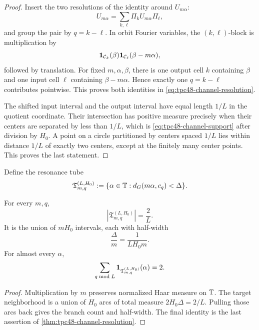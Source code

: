 \begin{proof}
Insert the two resolutions of the identity around \(U_{m\alpha}\):
\[
 U_{m\alpha}=\sum_{k,\ell}\Pi_kU_{m\alpha}\Pi_\ell,
\]
and group the pair by \(q=k-\ell\).  In orbit Fourier variables, the
\((k,\ell)\)-block is multiplication by
\begin{equation}
 \mathbf 1_{\mathcal C_k}(\beta)
 \mathbf 1_{\mathcal C_\ell}(\beta-m\alpha),
 \label{eq:tpc48-tile-multiplier}
\end{equation}
followed by translation.  For fixed \(m,\alpha,\beta\), there is one
output cell \(k\) containing \(\beta\) and one input cell \(\ell\)
containing \(\beta-m\alpha\).  Hence exactly one \(q=k-\ell\)
contributes pointwise.  This proves both identities in
\eqref{eq:tpc48-channel-resolution}.

The shifted input interval and the output interval have equal length
\(1/L\) in the quotient coordinate.  Their intersection has positive
measure precisely when their centers are separated by less than
\(1/L\), which is \eqref{eq:tpc48-channel-support} after division by
\(H_0\).  A point on a circle partitioned by centers spaced \(1/L\)
lies within distance \(1/L\) of exactly two centers, except at the
finitely many center points.  This proves the last statement.
\end{proof}

Define the resonance tube
\begin{equation}
 \mathfrak T_{m,q}^{(L,H_0)}
 :=\{\alpha\in\mathbb T:d_G(m\alpha,c_q)<\Delta\}.
 \label{eq:tpc48-resonance-tube}
\end{equation}

\begin{corollary}
\label{cor:tpc48-tube-geometry}
For every \(m,q\),
\begin{equation}
 |\mathfrak T_{m,q}^{(L,H_0)}|=\frac2L.
 \label{eq:tpc48-tube-measure}
\end{equation}
It is the union of \(mH_0\) intervals, each with half-width
\begin{equation}
 \frac{\Delta}{m}=\frac1{LH_0m}.
 \label{eq:tpc48-tube-halfwidth}
\end{equation}
For almost every \(\alpha\),
\begin{equation}
 \sum_{q\bmod L}\mathbf 1_{\mathfrak T_{m,q}^{(L,H_0)}}(\alpha)=2.
 \label{eq:tpc48-two-active-tubes}
\end{equation}
\end{corollary}

\begin{proof}
Multiplication by \(m\) preserves normalized Haar measure on \(\mathbb T\).
The target neighborhood is a union of \(H_0\) arcs of total measure
\(2H_0\Delta=2/L\).  Pulling those arcs back gives the branch count and
half-width.  The final identity is the last assertion of
\cref{thm:tpc48-channel-resolution}.
\end{proof}

